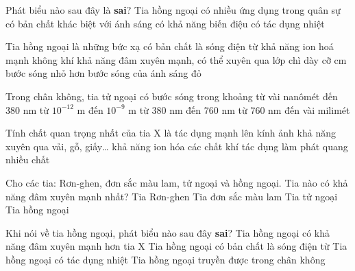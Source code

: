 \begin{ex}%
Phát biểu nào sau đây là \textbf{sai}? Tia hồng ngoại
\choice
{có nhiều ứng dụng trong quân sự}
{\True có bản chất khác biệt với ánh sáng}
{có khả năng biến điệu}
{có tác dụng nhiệt}
\end{ex} 
\begin{ex}%
Tia hồng ngoại là những bức xạ có
\choice
{\True bản chất là sóng điện từ}
{khả năng ion hoá mạnh không khí}
{khả năng đâm xuyên mạnh, có thể xuyên qua lớp chì dày cỡ cm}
{bước sóng nhỏ hơn bước sóng của ánh sáng đỏ}
\end{ex} 
\begin{ex}%
 Trong chân không, tia tử ngoại có bước sóng trong khoảng
\choice
{\True từ vài nanômét đến 380 nm}
{từ $10^{-12}$ m đến $10^{-9}$ m}
{từ 380 nm đến 760 nm}
{từ 760 nm đến vài milimét}
\end{ex} 
\begin{ex}%
Tính chất quan trọng nhất của tia X là
\choice
{tác dụng mạnh lên kính ảnh}
{\True khả năng xuyên qua vải, gỗ, giấy…}
{khả năng ion hóa các chất khí}
{tác dụng làm phát quang nhiều chất}
\end{ex} 
\begin{ex}%
Cho các tia: Rơn-ghen, đơn sắc màu lam, tử ngoại và hồng ngoại. Tia nào có khả năng đâm xuyên mạnh nhất?
\choice
{\True Tia Rơn-ghen}
{Tia đơn sắc màu lam}
{Tia tử ngoại}
{Tia hồng ngoại}
\end{ex} 
\begin{ex}%
Khi nói về tia hồng ngoại, phát biểu nào sau đây \textbf{sai}?
\choice
{\True Tia hồng ngoại có khả năng đâm xuyên mạnh hơn tia X}
{Tia hồng ngoại có bản chất là sóng điện từ}
{Tia hồng ngoại có tác dụng nhiệt}
{Tia hồng ngoại truyền được trong chân không}
\end{ex} 
